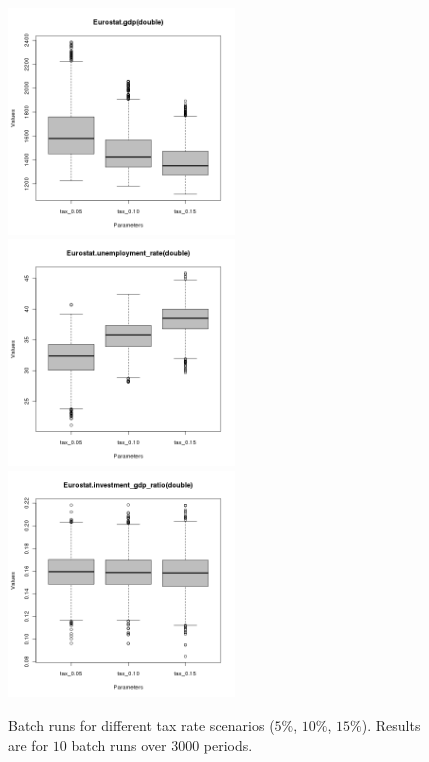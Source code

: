 \begin{figure}[ht!]
\centering\leavevmode
\begin{minipage}{7.5cm}
\centering\leavevmode
\includegraphics[width=6cm]{./batch/Eurostat-gdp-scenarios.png}\\
\includegraphics[width=6cm]{./batch/Eurostat-unemployment_rate-scenarios.png}\\
\includegraphics[width=6cm]{./batch/Eurostat-investment_gdp_ratio-scenarios.png}
\end{minipage}
\caption{Batch runs for different tax rate scenarios ($5\%$, $10\%$, $15\%$). Results are for $10$ batch runs over $3000$ periods.}
\label{Figure: scenarios}
\end{figure}
